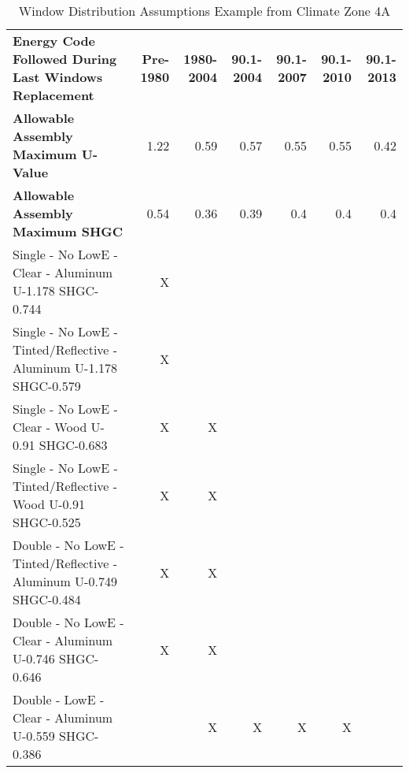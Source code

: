 \begin{table}
\scriptsize
\centering
\caption[Window Distribution Assumptions Example]{Window Distribution Assumptions Example from Climate Zone 4A}
\label{tab:window_distribution_4A}
\begin{tabular}{p{2.5in}|rrrrrr}
\textbf{Energy Code Followed During Last Windows Replacement}                      & \textbf{Pre-1980} & \textbf{1980-2004} & \textbf{90.1-2004} & \textbf{90.1-2007} & \textbf{90.1-2010} & \textbf{90.1-2013} \\
\textbf{Allowable Assembly Maximum U-Value}                                        & 1.22              & 0.59               & 0.57               & 0.55               & 0.55               & 0.42  \\
\textbf{Allowable Assembly Maximum SHGC}                                           & 0.54              & 0.36               & 0.39               & 0.4                & 0.4                & 0.4   \\ \hline
Single - No LowE - Clear - Aluminum \- U-1.178 SHGC-0.744                            & X                 &                    &                    &                    &                    &       \\ \hline
Single - No LowE - Tinted/Reflective - Aluminum \- U-1.178 SHGC-0.579                 & X                 &                    &                    &                    &                    &       \\ \hline
Single - No LowE - Clear - Wood \- U-0.91 SHGC-0.683                                  & X                 & X                  &                    &                    &                    &       \\ \hline
Single - No LowE - Tinted/Reflective - Wood \- U-0.91 SHGC-0.525                      & X                 & X                  &                    &                    &                    &       \\ \hline
Double - No LowE - Tinted/Reflective - Aluminum \- U-0.749 SHGC-0.484                 & X                 & X                  &                    &                    &                    &       \\ \hline
Double - No LowE - Clear - Aluminum \- U-0.746 SHGC-0.646                             & X                 & X                  &                    &                    &                    &       \\ \hline
Double - LowE - Clear - Aluminum \- U-0.559 SHGC-0.386                                &                   & X                  & X                  & X                  & X                  &       \\ \hline

\end{tabular}
\end{table}
